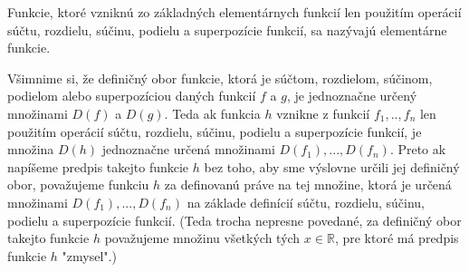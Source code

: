Funkcie, ktoré vzniknú zo základných elementárnych funkcií len použitím operácií súčtu, rozdielu, súčinu, podielu a superpozície funkcií, sa nazývajú elementárne funkcie.

Všimnime si, že definičný obor funkcie, ktorá je súčtom, rozdielom, súčinom, podielom alebo superpozíciou daných funkcií $f$ a $g$, je jednoznačne určený množinami $D(f)$ a $D(g)$. Teda ak funkcia $h$ vznikne z funkcií $f_1,..,f_n$ len použitím operácií súčtu, rozdielu, súčinu, podielu a superpozície funkcií, je množina $D(h)$ jednoznačne určená množinami $D(f_1),...,D(f_n)$. Preto ak napíšeme predpis takejto funkcie $h$ bez toho, aby sme výslovne určili jej definičný obor, považujeme funkciu $h$ za definovanú práve na tej množine, ktorá je určená množinami $D(f_1),...,D(f_n)$ na základe definícií súčtu, rozdielu, súčinu, podielu a superpozície funkcií. (Teda trocha nepresne povedané, za definičný obor takejto funkcie $h$ považujeme množinu všetkých tých $x\in\mathbb{R}$, pre ktoré má predpis funkcie $h$ "zmysel".)